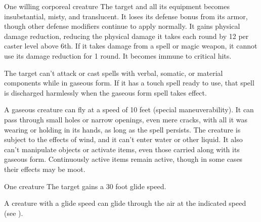 \begin{spellheader}
    \spellrng{\rngtouch}
    \spelldur{\durshort \dismissable}
\end{spellheader}
\begin{spelleffects}
    \begin{spelltarget}{One willing corporeal creature}
        \spelleffect The target and all its equipment becomes insubstantial, misty, and translucent. It loses its defense bonus from its armor, though other defense modifiers continue to apply normally. It gains physical damage reduction, reducing the physical damage it takes each round by 12  per caster level above 6th. If it takes damage from a spell or magic weapon, it cannot use its damage reduction for 1 round. It becomes immune to critical hits.

        The target can't attack or cast spells with verbal, somatic, or material components while in gaseous form. If it has a touch spell ready to use, that spell is discharged harmlessly when the gaseous form spell takes effect.
        \par A gaseous creature can fly at a speed of 10 feet (special maneuverability). It can pass through small holes or narrow openings, even mere cracks, with all it was wearing or holding in its hands, as long as the spell persists. The creature is subject to the effects of wind, and it can't enter water or other liquid. It also can't manipulate objects or activate items, even those carried along with its gaseous form. Continuously active items remain active, though in some cases their effects may be moot.
    \end{spelltarget}
\end{spelleffects}

\begin{spellheader}
    \spellrng{\rngmed}
    \spelldur{\durlong}
\end{spellheader}
\begin{spelleffects}
    \begin{spelltarget}{One creature}
        \spelleffect The target gains a 30 foot glide speed.
    \end{spelltarget}
\end{spelleffects}
\begin{spellfooter}
    \spellnotes A creature with a glide speed can glide through the air at the indicated speed (see ).
\end{spellfooter}

